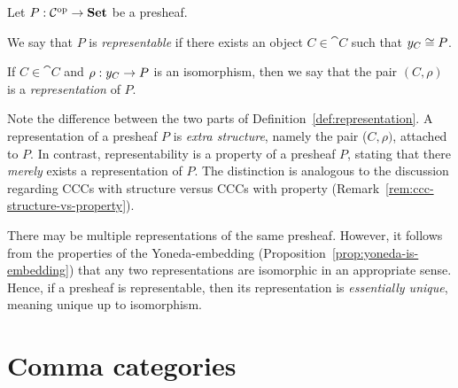 \begin{defn} \label{def:representation}
Let $P : \mathcal{C}^\mathrm{op} \to \mathbf{Set}$ be a presheaf.
\begin{enum}
\item We say that $P$ is \emph{representable} if there exists an object $C \in \cat{C}$ such that $y_{C} \cong P$.
\item If $C \in \cat{C}$ and $\rho : y_{C} \to P$ is an isomorphism, then we say that the pair $(C, \rho)$ is a \emph{representation} of $P$.
\end{enum}
\end{defn}

Note the difference between the two parts of Definition~\ref{def:representation}. A representation of a presheaf $P$ is \textit{extra structure}, namely the pair ($C, \rho)$, attached to $P$. In contrast, representability is a property of a presheaf $P$, stating that there \textit{merely} exists a representation of $P$. The distinction is analogous to the discussion regarding CCCs with structure versus CCCs with property (Remark~\ref{rem:ccc-structure-vs-property}).

\begin{rem}
There may be multiple representations of the same presheaf.
However, it follows from the properties of the Yoneda-embedding (Proposition~\ref{prop:yoneda-is-embedding}) that any two representations are isomorphic in an appropriate sense.
Hence, if a presheaf is representable, then its representation is \textit{essentially unique}, meaning unique up to isomorphism.
\end{rem}

\section{Comma categories}


